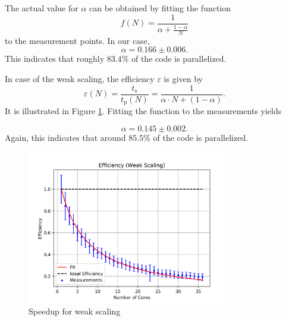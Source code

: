 \documentclass[12pt, a4paper, titlepage]{article}
\begin{document}
{The actual value for $\alpha$ can be obtained by fitting the function
\begin{equation}
f(N)=\frac{1}{\alpha + \frac{1-\alpha}{N}}
\end{equation}
to the measurement points. In our case,
\begin{equation} 
\alpha = 0.166 \pm 0.006.
\end{equation}
This indicates that roughly $83.4\%$ of the code is parallelized.

\newpage
In case of the weak scaling, the efficiency $\varepsilon$ is given by
\begin{equation*}
	\varepsilon (N) = \frac{t_\text{s}}{t_\text{p}(N)} = 	\frac{1}{\alpha\cdot N + (1-\alpha)}.
\end{equation*} 
It is illustrated in Figure \ref{fig:efficiency}. Fitting the function to the measurements yields


%


\begin{equation}
\alpha = 0.145 \pm 0.002.
\end{equation}
Again, this indicates that around $85.5\%$ of the code is parallelized.

\begin{figure}[h!]
\begin{center}
\includegraphics[width=0.8\textwidth]{pictures/speedup_weak.png}
\end{center}
\caption{Speedup for weak scaling}
\label{fig:efficiency}
\end{figure}


}
\end{document}
